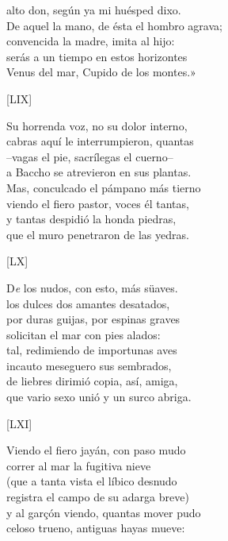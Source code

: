 \documentclass[11pt,a4paper,twoside]{article}
\newcommand{\ch}{\emph{\textsc{Ch}}}
\begin{document}
alto don, según ya mi huésped dixo.\\
De aquel la mano, de ésta el hombro agrava;\\
convencida la madre, imita al hijo:\\
serás a un tiempo en estos horizontes\\
Venus del mar, Cupido de los montes.»\par\pend
%
\begin{center}
	[LIX]
\end{center}\pstart
Su horrenda voz, no su dolor interno,\\
cabras aquí le interrumpieron, quantas\\
--vagas el pie, sacrílegas el cuerno--\\
a Baccho se atrevieron en sus plantas.\\
Mas, conculcado el pámpano más tierno\\
viendo el fiero pastor, voces él tantas,\\
y tantas despidió la honda piedras,\\
que el muro penetraron de las yedras.\par\pend
%
\begin{center}
	[LX]
\end{center}\pstart
D\emph{e} los nudos, con esto\edtext{}{\Afootnote[nosep]{q\emph{ue} honestos \emph{err.} {\ch}}}, más süaves.\\
los dulces dos amantes desatados,\\
por duras guijas, por espinas graves\\
solicitan el mar con pies alados:\\
tal, redimiendo de importunas aves\\
incauto meseguero sus sembrados,\\
de liebres dirimió copia, así, amiga,\\
que vario sexo unió y un surco abriga.\par\pend
%
\begin{center}
	[LXI]
\end{center}\pstart
Viendo el fiero jayán, con paso mudo\\
correr al mar la fugitiva nieve\\
(que a tanta vista el líbico desnudo\\
registra el campo de su adarga breve)\\
y al garçón viendo, quantas mover pudo\\
celoso trueno, antiguas hayas mueve:\\
\end{document}
